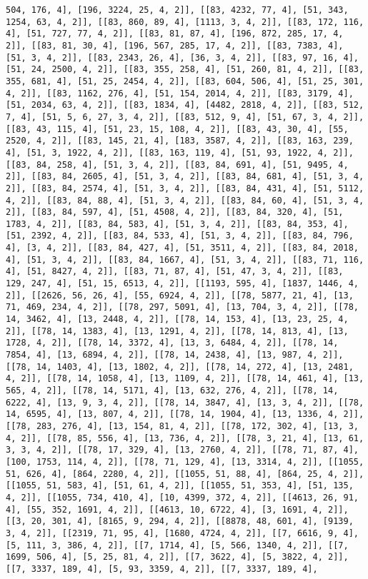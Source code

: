 \documentclass[12pt,fleqn]{article}\usepackage{../../common}
\begin{document}
\begin{verbatim}
504, 176, 4], [196, 3224, 25, 4, 2]], [[83, 4232, 77, 4], [51, 343, 1254, 63, 4, 2]], [[83, 860, 89, 4], [1113, 3, 4, 2]], [[83, 172, 116, 4], [51, 727, 77, 4, 2]], [[83, 81, 87, 4], [196, 872, 285, 17, 4, 2]], [[83, 81, 30, 4], [196, 567, 285, 17, 4, 2]], [[83, 7383, 4], [51, 3, 4, 2]], [[83, 2343, 26, 4], [36, 3, 4, 2]], [[83, 97, 16, 4], [51, 24, 2500, 4, 2]], [[83, 355, 258, 4], [51, 260, 81, 4, 2]], [[83, 355, 681, 4], [51, 25, 2454, 4, 2]], [[83, 604, 506, 4], [51, 25, 301, 4, 2]], [[83, 1162, 276, 4], [51, 154, 2014, 4, 2]], [[83, 3179, 4], [51, 2034, 63, 4, 2]], [[83, 1834, 4], [4482, 2818, 4, 2]], [[83, 512, 7, 4], [51, 5, 6, 27, 3, 4, 2]], [[83, 512, 9, 4], [51, 67, 3, 4, 2]], [[83, 43, 115, 4], [51, 23, 15, 108, 4, 2]], [[83, 43, 30, 4], [55, 2520, 4, 2]], [[83, 145, 21, 4], [183, 3587, 4, 2]], [[83, 163, 239, 4], [51, 3, 1922, 4, 2]], [[83, 163, 119, 4], [51, 93, 1922, 4, 2]], [[83, 84, 258, 4], [51, 3, 4, 2]], [[83, 84, 691, 4], [51, 9495, 4, 2]], [[83, 84, 2605, 4], [51, 3, 4, 2]], [[83, 84, 681, 4], [51, 3, 4, 2]], [[83, 84, 2574, 4], [51, 3, 4, 2]], [[83, 84, 431, 4], [51, 5112, 4, 2]], [[83, 84, 88, 4], [51, 3, 4, 2]], [[83, 84, 60, 4], [51, 3, 4, 2]], [[83, 84, 597, 4], [51, 4508, 4, 2]], [[83, 84, 320, 4], [51, 1783, 4, 2]], [[83, 84, 583, 4], [51, 3, 4, 2]], [[83, 84, 353, 4], [51, 2392, 4, 2]], [[83, 84, 533, 4], [51, 3, 4, 2]], [[83, 84, 796, 4], [3, 4, 2]], [[83, 84, 427, 4], [51, 3511, 4, 2]], [[83, 84, 2018, 4], [51, 3, 4, 2]], [[83, 84, 1667, 4], [51, 3, 4, 2]], [[83, 71, 116, 4], [51, 8427, 4, 2]], [[83, 71, 87, 4], [51, 47, 3, 4, 2]], [[83, 129, 247, 4], [51, 15, 6513, 4, 2]], [[1193, 595, 4], [1837, 1446, 4, 2]], [[2626, 56, 26, 4], [55, 6924, 4, 2]], [[78, 5877, 21, 4], [13, 71, 469, 234, 4, 2]], [[78, 297, 5091, 4], [13, 704, 3, 4, 2]], [[78, 14, 3462, 4], [13, 2448, 4, 2]], [[78, 14, 153, 4], [13, 23, 25, 4, 2]], [[78, 14, 1383, 4], [13, 1291, 4, 2]], [[78, 14, 813, 4], [13, 1728, 4, 2]], [[78, 14, 3372, 4], [13, 3, 6484, 4, 2]], [[78, 14, 7854, 4], [13, 6894, 4, 2]], [[78, 14, 2438, 4], [13, 987, 4, 2]], [[78, 14, 1403, 4], [13, 1802, 4, 2]], [[78, 14, 272, 4], [13, 2481, 4, 2]], [[78, 14, 1058, 4], [13, 1109, 4, 2]], [[78, 14, 461, 4], [13, 565, 4, 2]], [[78, 14, 5171, 4], [13, 632, 276, 4, 2]], [[78, 14, 6222, 4], [13, 9, 3, 4, 2]], [[78, 14, 3847, 4], [13, 3, 4, 2]], [[78, 14, 6595, 4], [13, 807, 4, 2]], [[78, 14, 1904, 4], [13, 1336, 4, 2]], [[78, 283, 276, 4], [13, 154, 81, 4, 2]], [[78, 172, 302, 4], [13, 3, 4, 2]], [[78, 85, 556, 4], [13, 736, 4, 2]], [[78, 3, 21, 4], [13, 61, 3, 3, 4, 2]], [[78, 17, 329, 4], [13, 2760, 4, 2]], [[78, 71, 87, 4], [100, 1753, 114, 4, 2]], [[78, 71, 129, 4], [13, 3314, 4, 2]], [[1055, 51, 626, 4], [864, 2280, 4, 2]], [[1055, 51, 88, 4], [864, 25, 4, 2]], [[1055, 51, 583, 4], [51, 61, 4, 2]], [[1055, 51, 353, 4], [51, 135, 4, 2]], [[1055, 734, 410, 4], [10, 4399, 372, 4, 2]], [[4613, 26, 91, 4], [55, 352, 1691, 4, 2]], [[4613, 10, 6722, 4], [3, 1691, 4, 2]], [[3, 20, 301, 4], [8165, 9, 294, 4, 2]], [[8878, 48, 601, 4], [9139, 3, 4, 2]], [[2319, 71, 95, 4], [1680, 4724, 4, 2]], [[7, 6616, 9, 4], [5, 111, 3, 386, 4, 2]], [[7, 1714, 4], [5, 566, 1340, 4, 2]], [[7, 1699, 506, 4], [5, 25, 81, 4, 2]], [[7, 3622, 4], [5, 3822, 4, 2]], [[7, 3337, 189, 4], [5, 93, 3359, 4, 2]], [[7, 3337, 189, 4], 
\end{verbatim}
\end{document}
